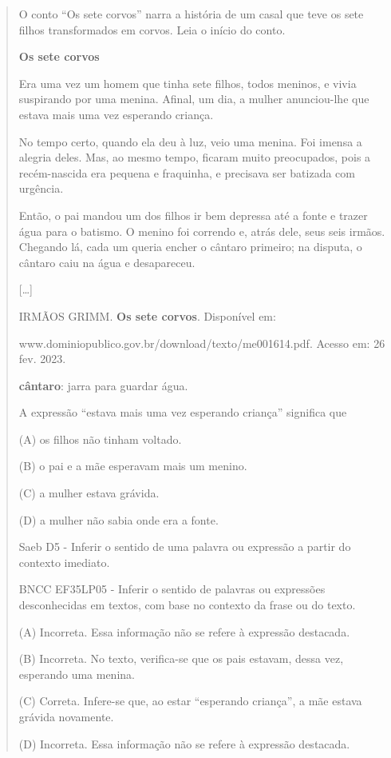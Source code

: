 \begin{quote}
O conto ``Os sete corvos'' narra a história de um casal que teve os sete
filhos transformados em corvos. Leia o início do conto.

\textbf{Os sete corvos}

Era uma vez um homem que tinha sete filhos, todos meninos, e vivia
suspirando por uma menina. Afinal, um dia, a mulher anunciou-lhe que
estava mais uma vez esperando criança.

No tempo certo, quando ela deu à luz, veio uma menina. Foi imensa a
alegria deles. Mas, ao mesmo tempo, ficaram muito preocupados, pois a
recém-nascida era pequena e fraquinha, e precisava ser batizada com
urgência.

Então, o pai mandou um dos filhos ir bem depressa até a fonte e trazer
água para o batismo. O menino foi correndo e, atrás dele, seus seis
irmãos. Chegando lá, cada um queria encher o cântaro primeiro; na
disputa, o cântaro caiu na água e desapareceu.

{[}\ldots{}{]}

IRMÃOS GRIMM. \textbf{Os sete corvos}. Disponível em:

www.dominiopublico.gov.br/download/texto/me001614.pdf. Acesso em: 26
fev. 2023.

\textbf{cântaro}: jarra para guardar água.

A expressão ``estava mais uma vez esperando criança'' significa que

(A) os filhos não tinham voltado.

(B) o pai e a mãe esperavam mais um menino.

(C) a mulher estava grávida.

(D) a mulher não sabia onde era a fonte.

Saeb D5 - Inferir o sentido de uma palavra ou expressão a partir do
contexto imediato.

BNCC EF35LP05 - Inferir o sentido de palavras ou expressões
desconhecidas em textos, com base no contexto da frase ou do texto.

(A) Incorreta. Essa informação não se refere à expressão destacada.

(B) Incorreta. No texto, verifica-se que os pais estavam, dessa vez,
esperando uma menina.

(C) Correta. Infere-se que, ao estar ``esperando criança'', a mãe estava
grávida novamente.

(D) Incorreta. Essa informação não se refere à expressão destacada.
\end{quote}

